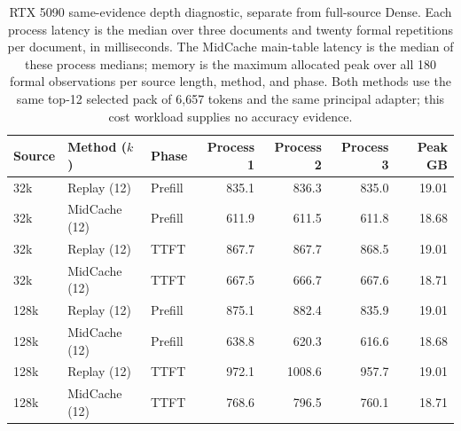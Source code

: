 \begin{table}[htbp]
\centering
\small
\setlength{\tabcolsep}{4pt}
\begin{tabular}{@{}lllrrrr@{}}
\toprule
Source & Method ($k$) & Phase & Process 1 & Process 2 & Process 3 & Peak GB\\
\midrule
32k & Replay (12) & Prefill & 835.1 & 836.3 & 835.0 & 19.01\\
32k & MidCache (12) & Prefill & 611.9 & 611.5 & 611.8 & 18.68\\
32k & Replay (12) & TTFT & 867.7 & 867.7 & 868.5 & 19.01\\
32k & MidCache (12) & TTFT & 667.5 & 666.7 & 667.6 & 18.71\\
\midrule
128k & Replay (12) & Prefill & 875.1 & 882.4 & 835.9 & 19.01\\
128k & MidCache (12) & Prefill & 638.8 & 620.3 & 616.6 & 18.68\\
128k & Replay (12) & TTFT & 972.1 & 1008.6 & 957.7 & 19.01\\
128k & MidCache (12) & TTFT & 768.6 & 796.5 & 760.1 & 18.71\\
\bottomrule
\end{tabular}
\caption{RTX 5090 same-evidence depth diagnostic, separate from full-source Dense. Each process latency is the median over three documents and twenty formal repetitions per document, in milliseconds. The MidCache main-table latency is the median of these process medians; memory is the maximum allocated peak over all 180 formal observations per source length, method, and phase. Both methods use the same top-12 selected pack of 6,657 tokens and the same principal adapter; this cost workload supplies no accuracy evidence.}
\label{tab:local-infra-processes}
\end{table}
